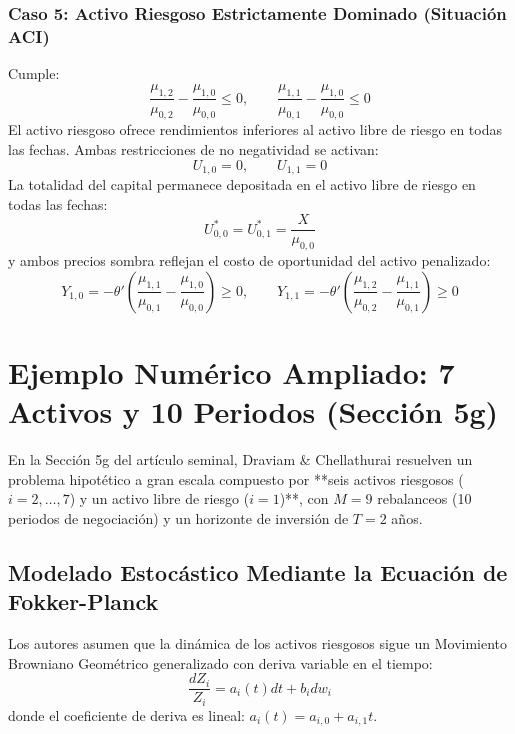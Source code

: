 \documentclass[11pt,a4paper]{report}
\numberwithin{equation}{chapter}
\begin{document}
\subsubsection{Caso 5: Activo Riesgoso Estrictamente Dominado (Situación ACI)}
Cumple:
\begin{equation}
    \frac{\mu_{1,2}}{\mu_{0,2}} - \frac{\mu_{1,0}}{\mu_{0,0}} \le 0, \qquad \frac{\mu_{1,1}}{\mu_{0,1}} - \frac{\mu_{1,0}}{\mu_{0,0}} \le 0
\end{equation}
El activo riesgoso ofrece rendimientos inferiores al activo libre de riesgo en todas las fechas. Ambas restricciones de no negatividad se activan:
\begin{equation}
    U_{1,0} = 0, \qquad U_{1,1} = 0
\end{equation}
La totalidad del capital permanece depositada en el activo libre de riesgo en todas las fechas:
\begin{equation}
    \boxed{U_{0,0}^* = U_{0,1}^* = \frac{X}{\mu_{0,0}}}
\end{equation}
y ambos precios sombra reflejan el costo de oportunidad del activo penalizado:
\begin{equation}
    Y_{1,0} = -\theta' \left( \frac{\mu_{1,1}}{\mu_{0,1}} - \frac{\mu_{1,0}}{\mu_{0,0}} \right) \ge 0, \qquad Y_{1,1} = -\theta' \left( \frac{\mu_{1,2}}{\mu_{0,2}} - \frac{\mu_{1,1}}{\mu_{0,1}} \right) \ge 0
\end{equation}

\section{Ejemplo Numérico Ampliado: 7 Activos y 10 Periodos (Sección 5g)}

En la Sección 5g del artículo seminal, Draviam \& Chellathurai resuelven un problema hipotético a gran escala compuesto por **seis activos riesgosos ($i=2,\dots,7$) y un activo libre de riesgo ($i=1$)**, con $M=9$ rebalanceos (10 periodos de negociación) y un horizonte de inversión de $T=2$ años.

\subsection{Modelado Estocástico Mediante la Ecuación de Fokker-Planck}
Los autores asumen que la dinámica de los activos riesgosos sigue un Movimiento Browniano Geométrico generalizado con deriva variable en el tiempo:
\begin{equation}
    \frac{dZ_i}{Z_i} = a_i(t) dt + b_i dw_i
\end{equation}
donde el coeficiente de deriva es lineal: $a_i(t) = a_{i,0} + a_{i,1} t$.
\end{document}
